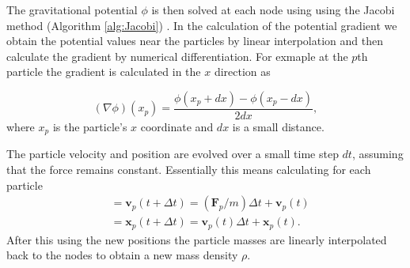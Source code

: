 \documentclass[notitlepage, 12pt]{article}
\begin{document}
The gravitational potential $\phi$ is then solved at each node using using the Jacobi method (Algorithm \ref{alg:Jacobi}) . In the calculation of the potential gradient we obtain the potential values near the particles by linear interpolation and then calculate the gradient by numerical differentiation. For exmaple at the $p$th particle the gradient is calculated in the $x$ direction as

\begin{equation}
(\nabla \phi)(x_p)=\frac{\phi(x_p+dx)-\phi(x_p-dx)}{2dx},
\end{equation}
where $x_p$ is the particle's $x$ coordinate and $dx$ is a small distance.  

The particle velocity and position are evolved over a small time step $dt$, assuming that the force remains constant. Essentially this means calculating for each particle
\begin{align}
&=\mathbf{v}_p(t+\Delta t) = (\mathbf{F}_p/m)\Delta t + \mathbf{v}_p(t)\\
&=\mathbf{x}_p(t+\Delta t) = \mathbf{v}_p(t)\Delta t + \mathbf{x}_p(t).
\end{align}
After this using the new positions the particle masses are linearly interpolated back to the nodes to obtain a new mass density $\rho$.
\end{document}
